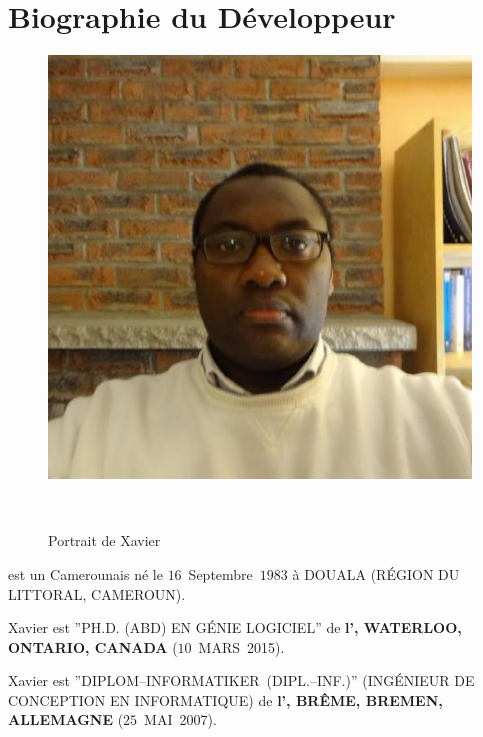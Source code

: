 \vspace{-1.1em}
\section{Biographie du D\'eveloppeur}\label{chap:biography}
\vspace{-0.9em}
\begin{figure}[!htpb]
\centering
\includegraphics[scale=0.35]{../images/XavierNOUNDOU-2}
\caption{Portrait de Xavier}~\label{fig:xaviernoumbis}
\end{figure}

\textbf{\myfullacademicname} est un Camerounais
n\'e le $16$~Septembre~$1983$ \`a DOUALA (R\'EGION DU LITTORAL, CAMEROUN).

Xavier est ''PH.D. (ABD) EN G\'ENIE LOGICIEL'' de
\textbf{l'\uwaterloo, WATERLOO, ONTARIO, CANADA}
($10$~MARS~2015).

Xavier est ''DIPLOM--INFORMATIKER~(DIPL.--INF.)''
(ING\'ENIEUR DE CONCEPTION EN INFORMATIQUE) de
\textbf{l'\bremenu, BR\^EME, BREMEN, ALLEMAGNE}
($25$~MAI~2007).